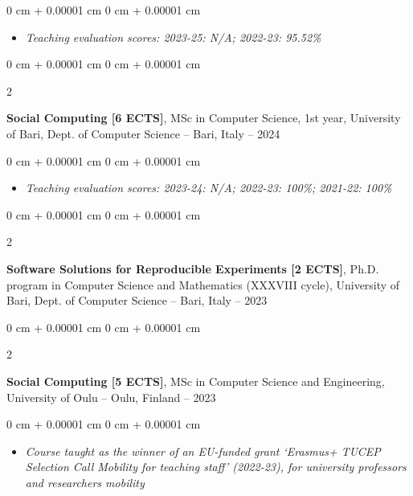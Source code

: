 \documentclass[10pt, a4paper]{article}
\newenvironment{highlights}{
    \begin{itemize}[
        topsep=0.10 cm,
        parsep=0.10 cm,
        partopsep=0pt,
        itemsep=0pt,
        leftmargin=0 cm + 10pt
    ]
}{
    \end{itemize}
} %
\newenvironment{onecolentry}{
    \begin{adjustwidth}{
        0 cm + 0.00001 cm
    }{
        0 cm + 0.00001 cm
    }
}{
    \end{adjustwidth}
} %
\newenvironment{twocolentry}[2][]{
    \onecolentry
    \def\secondColumn{#2}
    \setcolumnwidth{\fill, 4.5 cm}
    \begin{paracol}{2}
}{
    \switchcolumn \raggedleft \secondColumn
    \end{paracol}
    \endonecolentry
} %
\begin{document}
        \vspace{0.10 cm}
        \begin{onecolentry}
            \begin{highlights}
                \item \textit{Teaching evaluation scores:  2023-25: N/A; 2022-23: 95.52\%}
            \end{highlights}
        \end{onecolentry}


        \vspace{0.2 cm}

        \begin{twocolentry}{
            2021 – 2024
        }
            \textbf{Social Computing [6 ECTS]}, MSc in Computer Science, 1st year, University of Bari, Dept. of Computer Science -- Bari, Italy\end{twocolentry}

        \vspace{0.10 cm}
        \begin{onecolentry}
            \begin{highlights}
                \item \textit{Teaching evaluation scores: 2023-24: N/A; 2022-23: 100\%; 2021-22: 100\%}
            \end{highlights}
        \end{onecolentry}


        \vspace{0.2 cm}

        \begin{twocolentry}{
            2022 – 2023
        }
            \textbf{Software Solutions for Reproducible Experiments [2 ECTS]}, Ph.D. program in Computer Science and Mathematics (XXXVIII cycle), University of Bari, Dept. of Computer Science -- Bari, Italy\end{twocolentry}



        \vspace{0.2 cm}

        \begin{twocolentry}{
            2022 – 2023
        }
            \textbf{Social Computing [5 ECTS]}, MSc in Computer Science and Engineering, University of Oulu -- Oulu, Finland\end{twocolentry}

        \vspace{0.10 cm}
        \begin{onecolentry}
            \begin{highlights}
                \item \textit{Course taught as the winner of an EU-funded grant `Erasmus+ TUCEP Selection Call Mobility for teaching staff' (2022-23), for university professors and researchers mobility}
            \end{highlights}
        \end{onecolentry}
\end{document}
